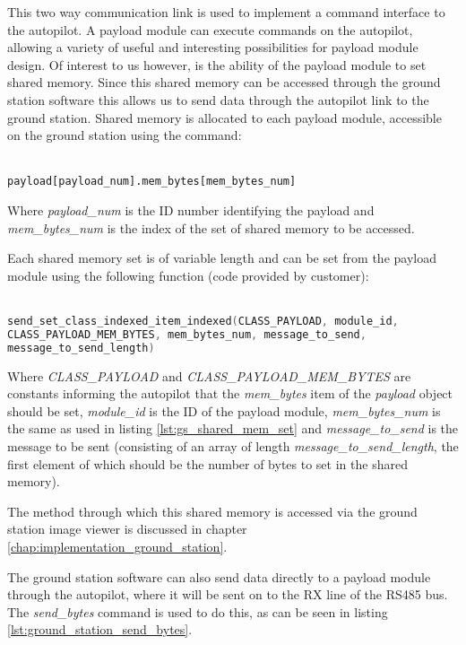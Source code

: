 This two way communication link is used to implement a command interface to 
the autopilot. A payload module can execute commands on the autopilot, 
allowing a variety of useful and interesting possibilities for payload
module design. Of interest to us however, is the ability of the payload
module to set shared memory. Since this shared memory can be accessed 
through the ground station software this allows us to send data through the
autopilot link to the ground station. Shared memory is allocated to 
each payload module, accessible on the ground station using the command:
~\\
~\\
\begin{lstlisting}[caption={Accessing shared memory from ground station}, label=lst:gs_shared_mem_set]
payload[payload_num].mem_bytes[mem_bytes_num]
\end{lstlisting}

Where \emph{payload\_num} is the ID number identifying the payload and 
\emph{mem\_bytes\_num} is the index of the set of shared memory to be accessed.

Each shared memory set is of variable length and can be set from the payload 
module using the following function (code provided by customer):
~\\
~\\
\begin{lstlisting}[language=C, caption={Setting shared memory from payload module}, label=lst:payload_shared_mem_set]
send_set_class_indexed_item_indexed(CLASS_PAYLOAD, module_id, 
CLASS_PAYLOAD_MEM_BYTES, mem_bytes_num, message_to_send,
message_to_send_length)
\end{lstlisting}

Where \emph{CLASS\_PAYLOAD} and \emph{CLASS\_PAYLOAD\_MEM\_BYTES} are constants 
informing the autopilot that the \emph{mem\_bytes} item of the \emph{payload} 
object should be set, \emph{module\_id} is the ID of the payload module,
\emph{mem\_bytes\_num} is the same as used in listing
\ref{lst:gs_shared_mem_set} and \emph{message\_to\_send} is the message to be 
sent (consisting of an array of length \emph{message\_to\_send\_length}, the 
first element of which should be the number of bytes to set in the shared 
memory).

The method through which this shared memory is accessed via the ground station
image viewer is discussed in chapter \ref{chap:implementation_ground_station}.

The ground station software can also send data directly to a payload module 
through the autopilot, where it will be sent on to the RX line of the RS485
bus. The \emph{send\_bytes} command is used to do this, as can be seen in 
listing \ref{lst:ground_station_send_bytes}. 

